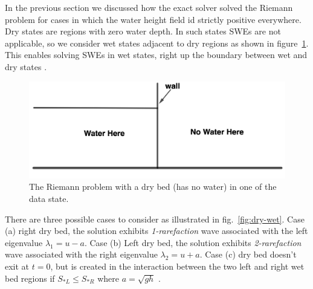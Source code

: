 \documentclass[12pt,a4paper]{article}
\newcommand{\donna}[1]{{\color{red}{#1}}}
\begin{document}
	In the previous section we discussed how the exact solver solved the Riemann problem for cases in which the water height field id strictly positive everywhere. Dry states are regions with zero water depth. In such states SWEs are not applicable, so we consider wet states adjacent to dry regions as shown in figure~\ref{fig:dry-bed}. This enables solving SWEs in wet states, right up the boundary between wet and dry states \citep{toro2001shock}.
	\begin{figure}[H]
		\centering
		\includegraphics[width=0.5\linewidth]{images/dd1}
		\caption{ The Riemann problem with a dry bed (has no water) in one of the data state. \donna{Replace this figure with your own figure}}
		\label{fig:dry-bed}
	\end{figure}
	There are three possible cases to consider as illustrated in fig.~\ref{fig:dry-wet}. Case (a) right dry bed, the solution exhibits {\em 1-rarefaction} wave associated with the left eigenvalue $\lambda_1 = u - a$. Case (b) Left dry bed, the solution exhibits {\em 2-rarefaction} wave associated with the right eigenvalue $\lambda_2 = u + a$. Case (c) dry bed doesn't exit at $t=0$, but is created in the interaction between the two left and right wet bed regions if $S_{*L} \le S_{*R}$ where $a = \sqrt{gh}$ \cite{toro2001shock}.
	
\end{document}

